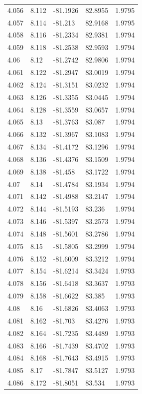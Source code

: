 \begin{tabular}{lllll}
4.056 & 8.112 & -81.1926 & 82.8955 & 1.9795 \\
4.057 & 8.114 & -81.213 & 82.9168 & 1.9795 \\
4.058 & 8.116 & -81.2334 & 82.9381 & 1.9794 \\
4.059 & 8.118 & -81.2538 & 82.9593 & 1.9794 \\
4.06 & 8.12 & -81.2742 & 82.9806 & 1.9794 \\
4.061 & 8.122 & -81.2947 & 83.0019 & 1.9794 \\
4.062 & 8.124 & -81.3151 & 83.0232 & 1.9794 \\
4.063 & 8.126 & -81.3355 & 83.0445 & 1.9794 \\
4.064 & 8.128 & -81.3559 & 83.0657 & 1.9794 \\
4.065 & 8.13 & -81.3763 & 83.087 & 1.9794 \\
4.066 & 8.132 & -81.3967 & 83.1083 & 1.9794 \\
4.067 & 8.134 & -81.4172 & 83.1296 & 1.9794 \\
4.068 & 8.136 & -81.4376 & 83.1509 & 1.9794 \\
4.069 & 8.138 & -81.458 & 83.1722 & 1.9794 \\
4.07 & 8.14 & -81.4784 & 83.1934 & 1.9794 \\
4.071 & 8.142 & -81.4988 & 83.2147 & 1.9794 \\
4.072 & 8.144 & -81.5193 & 83.236 & 1.9794 \\
4.073 & 8.146 & -81.5397 & 83.2573 & 1.9794 \\
4.074 & 8.148 & -81.5601 & 83.2786 & 1.9794 \\
4.075 & 8.15 & -81.5805 & 83.2999 & 1.9794 \\
4.076 & 8.152 & -81.6009 & 83.3212 & 1.9794 \\
4.077 & 8.154 & -81.6214 & 83.3424 & 1.9793 \\
4.078 & 8.156 & -81.6418 & 83.3637 & 1.9793 \\
4.079 & 8.158 & -81.6622 & 83.385 & 1.9793 \\
4.08 & 8.16 & -81.6826 & 83.4063 & 1.9793 \\
4.081 & 8.162 & -81.703 & 83.4276 & 1.9793 \\
4.082 & 8.164 & -81.7235 & 83.4489 & 1.9793 \\
4.083 & 8.166 & -81.7439 & 83.4702 & 1.9793 \\
4.084 & 8.168 & -81.7643 & 83.4915 & 1.9793 \\
4.085 & 8.17 & -81.7847 & 83.5127 & 1.9793 \\
4.086 & 8.172 & -81.8051 & 83.534 & 1.9793 \\

\end{tabular}

